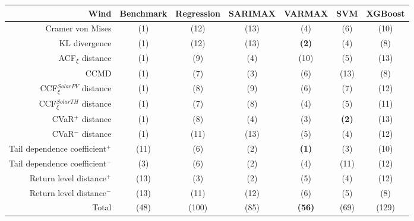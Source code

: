 \newpage
\begin{table}[ht]
    \footnotesize
    \begin{tabular}[l]{r|c|ccc|cc|}
        \toprule
        \textbf{Wind} &Benchmark&Regression&SARIMAX&VARMAX&SVM&XGBoost \\
        \midrule            
        Cramer von Mises&(1)&(12)&(13)&(4)&(6)&(10) \\
        KL divergence&(1)&(12)&(13)&\textbf{(2)}&(4)&(8) \\
        ACF$_\xi$ distance&(1)&(9)&(4)&(10)&(5)&(13) \\
        \midrule
        CCMD&(1)&(7)&(3)&(6)&(13)&(8) \\
        CCF$_\xi^{Solar PV}$ distance&(1)&(8)&(9)&(6)&(7)&(12) \\
        CCF$_\xi^{Solar TH}$ distance&(1)&(7)&(8)&(4)&(5)&(11) \\
        \midrule
        CVaR$^+$ distance&(1)&(8)&(4)&(3)&\textbf{(2)}&(13) \\
        CVaR$^-$ distance&(1)&(11)&(13)&(5)&(4)&(12) \\
        Tail dependence coefficient$^+$&(11)&(6)&(2)&\textbf{(1)}&(3)&(10) \\
        Tail dependence coefficient$^-$&(3)&(6)&(2)&(4)&(11)&(12) \\
        Return level distance$^+$&(13)&(3)&(2)&(5)&(4)&(12) \\
        Return level distance$^-$&(13)&(11)&(12)&(6)&(5)&(8) \\
        \bottomrule
        Total&(48)&(100)&(85)&\textbf{(56)}&(69)&(129) \\
        \bottomrule
    \end{tabular}
\end{table}
